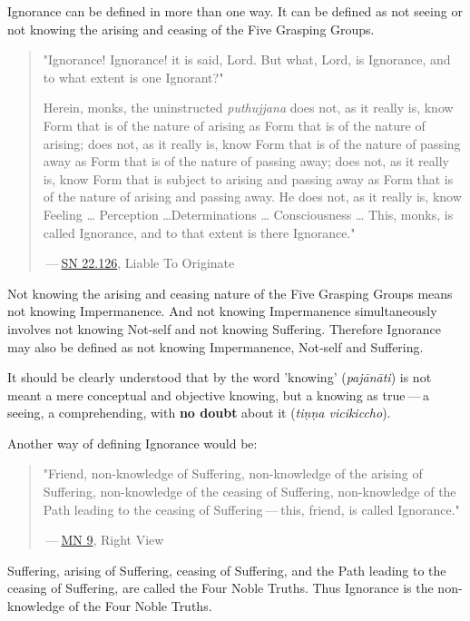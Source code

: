 Ignorance can be defined in more than one way. It can be defined as not
seeing or not knowing the arising and ceasing of the Five Grasping
Groups.


\begin{quotation}
"Ignorance! Ignorance! it is said, Lord. But what, Lord, is Ignorance,
and to what extent is one Ignorant?"


Herein, monks, the uninstructed \emph{puthujjana} does not, as it really is,
know Form that is of the nature of arising as Form that is of the nature
of arising; does not, as it really is, know Form that is of the nature
of passing away as Form that is of the nature of passing away; does not,
as it really is, know Form that is subject to arising and passing away
as Form that is of the nature of arising and passing away. He does not,
as it really is, know Feeling …​ Perception …​ Determinations …​
Consciousness …​ This, monks, is called Ignorance, and to that extent
is there Ignorance."


 — \href{https://suttacentral.net/sn22.126/en/sujato}{SN 22.126}, Liable To Originate


\end{quotation}

Not knowing the arising and ceasing nature of the Five Grasping Groups
means not knowing Impermanence. And not knowing Impermanence
simultaneously involves not knowing Not-self and not knowing Suffering.
Therefore Ignorance may also be defined as not knowing Impermanence,
Not-self and Suffering.


It should be clearly understood that by the word 'knowing'
(\emph{pajānāti}) is not meant a mere conceptual and objective knowing, but
a knowing as true — a seeing, a comprehending, with \textbf{no doubt} about it
(\emph{tiṇṇa vicikiccho}).


Another way of defining Ignorance would be:


\begin{quotation}
"Friend, non-knowledge of Suffering, non-knowledge of the arising of
Suffering, non-knowledge of the ceasing of Suffering, non-knowledge of
the Path leading to the ceasing of Suffering — this, friend, is called
Ignorance."


 — \href{https://suttacentral.net/mn9/en/bodhi}{MN 9}, Right View


\end{quotation}

Suffering, arising of Suffering, ceasing of Suffering, and the Path
leading to the ceasing of Suffering, are called the Four Noble Truths.
Thus Ignorance is the non-knowledge of the Four Noble Truths.


